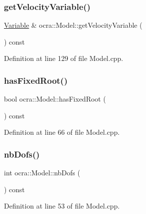 \subsubsection{\texorpdfstring{get\+Velocity\+Variable()}{getVelocityVariable()}}
{\footnotesize\ttfamily \hyperlink{classocra_1_1Variable}{Variable} \& ocra\+::\+Model\+::get\+Velocity\+Variable (\begin{DoxyParamCaption}{ }\end{DoxyParamCaption}) const}



Definition at line 129 of file Model.\+cpp.

\hypertarget{classocra_1_1Model_a6f300d27fc0363c1cc6cb016e5c1d566}{}\label{classocra_1_1Model_a6f300d27fc0363c1cc6cb016e5c1d566} 
\subsubsection{\texorpdfstring{has\+Fixed\+Root()}{hasFixedRoot()}}
{\footnotesize\ttfamily bool ocra\+::\+Model\+::has\+Fixed\+Root (\begin{DoxyParamCaption}{ }\end{DoxyParamCaption}) const}



Definition at line 66 of file Model.\+cpp.

\hypertarget{classocra_1_1Model_a804d4f0be4307d635555232f534734e9}{}\label{classocra_1_1Model_a804d4f0be4307d635555232f534734e9} 
\subsubsection{\texorpdfstring{nb\+Dofs()}{nbDofs()}}
{\footnotesize\ttfamily int ocra\+::\+Model\+::nb\+Dofs (\begin{DoxyParamCaption}{ }\end{DoxyParamCaption}) const}



Definition at line 53 of file Model.\+cpp.

\hypertarget{classocra_1_1Model_af333cdd36691a741a978bb72c004bf07}{}\label{classocra_1_1Model_af333cdd36691a741a978bb72c004bf07} 
